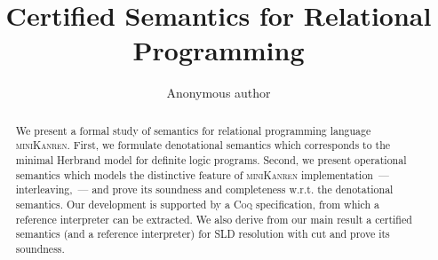 \documentclass[runningheads]{llncs}
\title{Certified Semantics for Relational Programming}
\author{Anonymous author}
\institute{Anonymous institute}
\begin{document}
\setlength{\belowcaptionskip}{-5pt}
\setlength{\abovecaptionskip}{0pt}

\setlength{\abovedisplayskip}{-3pt}
\setlength{\belowdisplayskip}{-2pt}
\setlength{\abovedisplayshortskip}{0pt}
\setlength{\belowdisplayshortskip}{2pt}

\maketitle

\begin{abstract}
  We present a formal study of semantics for relational programming language \textsc{miniKanren}. First,
  we formulate denotational semantics which corresponds to the minimal Herbrand model for definite logic
  programs. Second, we present operational semantics which models the distinctive feature of \textsc{miniKanren}
  implementation~--- interleaving,~--- and prove its soundness and completeness w.r.t. the denotational semantics.
  Our development is supported by a \textsc{Coq} specification, from which a reference interpreter can be
  extracted. We also derive from our main result a certified semantics (and a reference interpreter) for SLD resolution
  with cut and prove its soundness.
\end{abstract}
















\appendix

\end{document}
